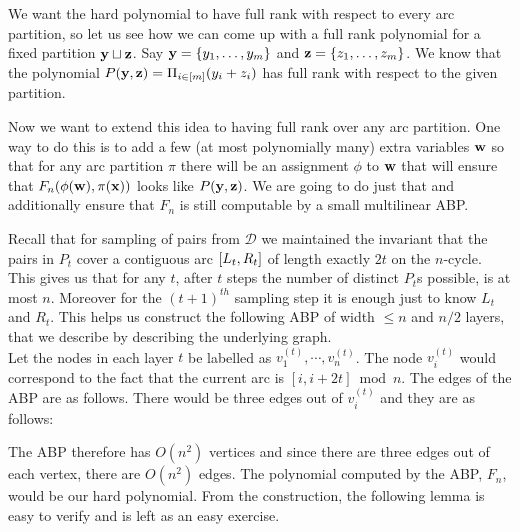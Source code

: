 We want the hard polynomial to have full rank with respect to every arc partition, so let us see how we can come up with a full rank polynomial for a fixed partition $\mathbf{y} \sqcup \mathbf{z}$. Say $\mathbf{y} = \left\{y_1,\ldots,y_m\right\}$ and $\mathbf{z} = \left\{z_1,\ldots,z_m\right\}$. We know that the polynomial $P(\mathbf{y},\mathbf{z}) = \Pi_{i \in [m]} (y_i + z_i)$ has full rank with respect to the given partition.

Now we want to extend this idea to having full rank over any arc partition. One way to do this is to add a few (at most polynomially many) extra variables $\mathbf{w}$ so that for any arc partition $\pi$ there will be an assignment $\phi$ to $\mathbf{w}$ that will ensure that $F_n(\phi(\mathbf{w}),\pi(\mathbf{x}))$ looks like $P(\mathbf{y},\mathbf{z})$. We are going to do just that and additionally ensure that $F_n$ is still computable by a small multilinear ABP.

Recall that for sampling of pairs from $\mathcal{D}$ we maintained the invariant that the pairs in $P_t$ cover a contiguous arc $\left[L_t, R_t\right]$ of length exactly $2t$ on the $n$-cycle. This gives us that for any $t$, after $t$ steps the number of distinct $P_t$s possible, is at most $n$. Moreover for the $(t+1)^{th}$ sampling step it is enough just to know $L_t$ and $R_t$. This helps us construct the following ABP of width $\leq n$ and $n/2$ layers, that we describe by describing the underlying graph.\\

Let the nodes in each layer $t$ be labelled as $v_1^{(t)},\cdots, v_n^{(t)}$. The node $v_i^{(t)}$ would correspond to the fact that the current arc is $[i,i+2t] \bmod{n}$. The edges of the ABP are as follows. There would be three edges out of $v_i^{(t)}$ and they are as follows:


The ABP therefore has $O(n^2)$ vertices and since there are three edges out of each vertex, there are $O(n^2)$ edges. The polynomial computed by the ABP, $F_n$, would be our hard polynomial. From the construction, the following lemma is easy to verify and is left as an easy exercise.


